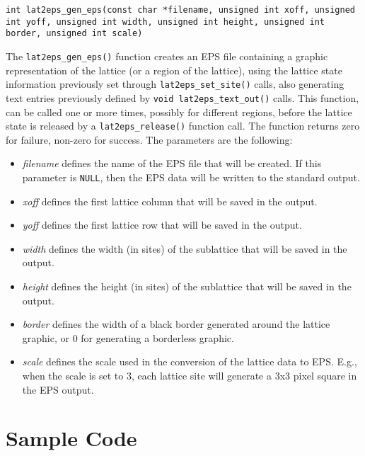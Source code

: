 \documentclass[a4paper]{article}
\begin{document}
\texttt{int lat2eps\_gen\_eps(const char *filename, unsigned int xoff, unsigned int yoff, unsigned int width, unsigned int height, unsigned int border, unsigned int scale)}
\bigbreak

The \texttt{lat2eps\_gen\_eps()} function creates an EPS file containing a graphic representation of the lattice (or a region of the lattice), using the lattice state information previously set through \texttt{lat2eps\_set\_site()} calls, also generating text entries previously defined by \texttt{void lat2eps\_text\_out()} calls. This function, can be called one or more times, possibly for different regions, before the lattice state is released by a \texttt{lat2eps\_release()} function call. The function returns zero for failure, non-zero for success. The parameters are the following:

\begin{itemize}
  \item \textit{filename} defines the name of the EPS file that will be created. If this parameter is \texttt{NULL}, then the EPS data will be written to the standard output.
  \item \textit{xoff} defines the first lattice column that will be saved in the output.
  \item \textit{yoff} defines the first lattice row that will be saved in the output.
  \item \textit{width} defines the width (in sites) of the sublattice that will be saved in the output.
  \item \textit{height} defines the height (in sites) of the sublattice that will be saved in the output.
  \item \textit{border} defines the width of a black border generated around the lattice graphic, or 0 for generating a borderless graphic.
  \item \textit{scale} defines the scale used in the conversion of the lattice data to EPS. E.g., when the scale is set to 3, each lattice site will generate a 3x3 pixel square in the EPS output.
\end{itemize} 
\bigbreak\bigbreak
\newpage

\section{Sample Code}
\end{document}
